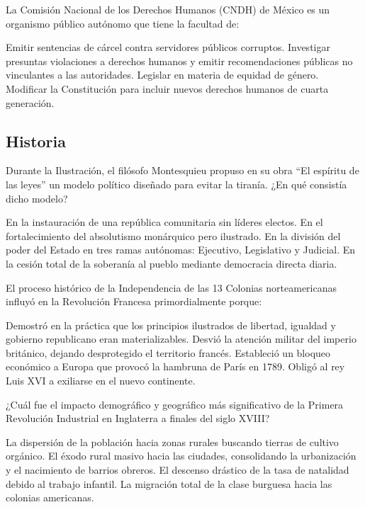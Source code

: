 \documentclass[12pt]{evaluasep}
\begin{document}
\begin{questions}
    \question La Comisión Nacional de los Derechos Humanos (CNDH) de México es un organismo público autónomo que tiene la facultad de:
    \begin{choices}
        \choice Emitir sentencias de cárcel contra servidores públicos corruptos.
        \CorrectChoice Investigar presuntas violaciones a derechos humanos y emitir recomendaciones públicas no vinculantes a las autoridades.
        \choice Legislar en materia de equidad de género.
        \choice Modificar la Constitución para incluir nuevos derechos humanos de cuarta generación.
    \end{choices}

    \subsection{Historia}
\question Durante la Ilustración, el filósofo Montesquieu propuso en su obra ``El espíritu de las leyes'' un modelo político diseñado para evitar la tiranía. ¿En qué consistía dicho modelo?
    \begin{choices}
        \choice En la instauración de una república comunitaria sin líderes electos.
        \choice En el fortalecimiento del absolutismo monárquico pero ilustrado.
        \CorrectChoice En la división del poder del Estado en tres ramas autónomas: Ejecutivo, Legislativo y Judicial.
        \choice En la cesión total de la soberanía al pueblo mediante democracia directa diaria.
    \end{choices}

    \question El proceso histórico de la Independencia de las 13 Colonias norteamericanas influyó en la Revolución Francesa primordialmente porque:
    \begin{choices}
        \CorrectChoice Demostró en la práctica que los principios ilustrados de libertad, igualdad y gobierno republicano eran materializables.
        \choice Desvió la atención militar del imperio británico, dejando desprotegido el territorio francés.
        \choice Estableció un bloqueo económico a Europa que provocó la hambruna de París en 1789.
        \choice Obligó al rey Luis XVI a exiliarse en el nuevo continente.
    \end{choices}

        \newpage

    \question ¿Cuál fue el impacto demográfico y geográfico más significativo de la Primera Revolución Industrial en Inglaterra a finales del siglo XVIII?
    \begin{choices}
        \choice La dispersión de la población hacia zonas rurales buscando tierras de cultivo orgánico.
        \CorrectChoice El éxodo rural masivo hacia las ciudades, consolidando la urbanización y el nacimiento de barrios obreros.
        \choice El descenso drástico de la tasa de natalidad debido al trabajo infantil.
        \choice La migración total de la clase burguesa hacia las colonias americanas.
    \end{choices}


\end{questions}
\end{document}
